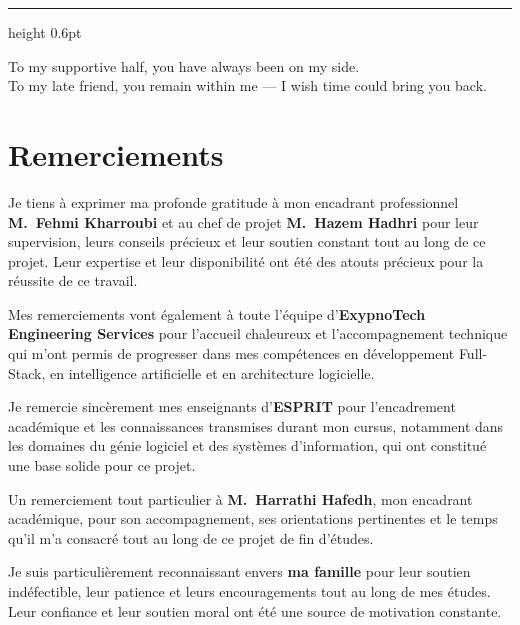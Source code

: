 \documentclass[12pt,a4paper]{report}
\begin{document}
\vspace{1.1cm}
{\color{rougeEsprit}\hrule height 0.6pt}
\vspace{1cm}

\begin{center}
\begin{minipage}{0.85\textwidth}
\centering
\itshape

To my supportive half, you have always been on my side.\\[8pt]
To my late friend, you remain within me — I wish time could bring you back.

\end{minipage}
\end{center}

\chapter*{Remerciements}

Je tiens à exprimer ma profonde gratitude à mon encadrant professionnel
\textbf{M.~Fehmi Kharroubi} et au chef de projet \textbf{M.~Hazem Hadhri}
pour leur supervision, leurs conseils précieux et leur soutien constant tout
au long de ce projet. Leur expertise et leur disponibilité ont été des atouts
précieux pour la réussite de ce travail.

Mes remerciements vont également à toute l'équipe d'\textbf{ExypnoTech
Engineering Services} pour l'accueil chaleureux et l'accompagnement technique
qui m'ont permis de progresser dans mes compétences en développement
Full-Stack, en intelligence artificielle et en architecture logicielle.

Je remercie sincèrement mes enseignants d'\textbf{ESPRIT} pour
l'encadrement académique et les connaissances transmises durant mon cursus,
notamment dans les domaines du génie logiciel et des systèmes d'information,
qui ont constitué une base solide pour ce projet.

Un remerciement tout particulier à \textbf{M.~Harrathi Hafedh}, mon encadrant
académique, pour son accompagnement, ses orientations pertinentes et le temps
qu'il m'a consacré tout au long de ce projet de fin d'études.

Je suis particulièrement reconnaissant envers \textbf{ma famille} pour leur
soutien indéfectible, leur patience et leurs encouragements tout au long de
mes études. Leur confiance et leur soutien moral ont été une source de
motivation constante.
\end{document}
